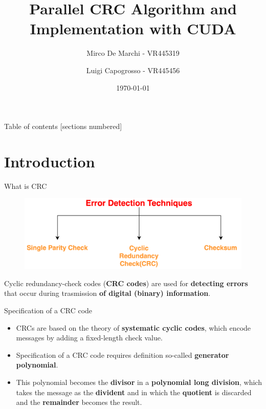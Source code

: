 \documentclass[10pt]{beamer}
\title
{
Parallel CRC Algorithm and Implementation with CUDA
}
\date{\today}
\author{Mirco De Marchi - VR445319 \and Luigi Capogrosso - VR445456}
\institute{University of Verona -  Department of Computer Science}
\begin{document}
\maketitle


\begin{frame}{Table of contents}
[sections numbered]
\tableofcontents%
\end{frame}


\section[Introduction]{Introduction}

\begin{frame}[fragile]{What is CRC}
\begin{figure}
\centering
\includegraphics[width=\columnwidth]{figures/EDT.png}
\label{fig:EDT}
\end{figure}

Cyclic redundancy-check codes (\textbf{CRC codes}) are used for 
\textbf{detecting errors} that occur during trasmission \textbf{of digital 
(binary) information}.
\end{frame}


\begin{frame}[fragile]{Specification of a CRC code}
\begin{itemize}
\item CRCs are based on the theory of \textbf{systematic cyclic codes}, 
which encode messages by adding a fixed-length check value.

\item Specification of a CRC code requires definition so-called 
\textbf{generator polynomial}.

\item This polynomial becomes the \textbf{divisor} in a 
\textbf{polynomial long division}, which takes the message as the 
\textbf{divident} and in which the \textbf{quotient} is discarded and the 
\textbf{remainder} becomes the result.
\end{itemize}
\end{frame}
\end{document}
